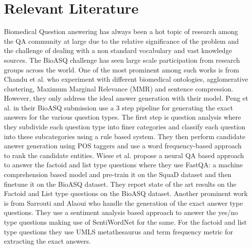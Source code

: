 \documentclass[11pt,a4paper]{article}
\begin{document}
\section{Relevant Literature}
\label{lit}
Biomedical Question answering has always been a hot topic of research among the QA community at large due to the relative significance of the problem and the challenge of dealing with a non standard vocabulary and vast knowledge sources. The BioASQ challenge has seen large scale participation from research groups across the world. One of the most prominent among such works is from Chandu et al.  who experiment with different biomedical ontologies, agglomerative clustering, Maximum Marginal Relevance (MMR) and sentence compression. However, they only address the ideal answer generation with their model. Peng et al.  in their BioASQ submission use a 3 step pipeline for generating the exact answers for the various question types. The first step is question analysis where they subdivide each question type into finer categories and classify each question into these subcategories using a rule based system. They then perform candidate answer generation using POS taggers and use a word frequency-based approach to rank the candidate entities. Wiese et al.  propose a neural QA based approach to answer the factoid and list type questions where they use FastQA: a machine comprehension based model \cite{fastqa-squad} and pre-train it on the SquaD dataset \cite{squad} and then finetune it on the BioASQ dataset. They report state of the art results on the Factoid and List type questions on the BioASQ dataset. Another prominent work is from Sarrouti and Alaoui  who handle the generation of the exact answer type questions. They use a sentiment analysis based approach to answer the yes/no type questions making use of SentiWordNet for the same. For the factoid and list type questions they use UMLS metathesaurus and term frequency metric for extracting the exact answers. %
\end{document}
